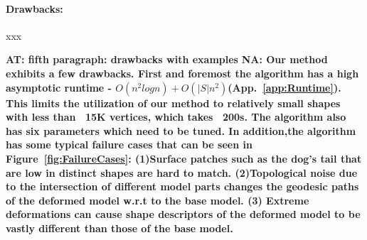 \documentclass[10pt,twocolumn,letterpaper]{article}
\newcommand{\colornote}[3]{{\color{#1}\bf{#2: #3}\normalfont}}
\newcommand{\colornote}[3]{}
\newcommand {\ayellet}[1]{\colornote{blue}{AT}{#1}}
\newcommand {\nadav}[1]{\colornote{red}{NA}{#1}}
\begin{document}
\paragraph{Drawbacks:} xxx


\ayellet{fifth paragraph: drawbacks with examples}
\nadav{Our method exhibits a few drawbacks.
    First and foremost the algorithm has a high asymptotic runtime - $O(n^2logn) + O(|S|n^2)$(App.~\ref{app:Runtime}). 
	This limits the utilization of our method to relatively small shapes with less than ~15K vertices, which takes ~200s. 
	The algorithm also has six parameters which need to be tuned. 
	In addition,the algorithm has some typical failure cases that can be seen in Figure~\ref{fig:FailureCases}: 
	(1)Surface patches such as the dog's tail that are low in distinct shapes are hard to match. (2)Topological noise due to the intersection of different model parts changes the geodesic paths of the deformed model w.r.t to the base model.
(3) Extreme deformations can cause shape descriptors of the deformed model to be vastly different than those of the base model.}
\end{document}
